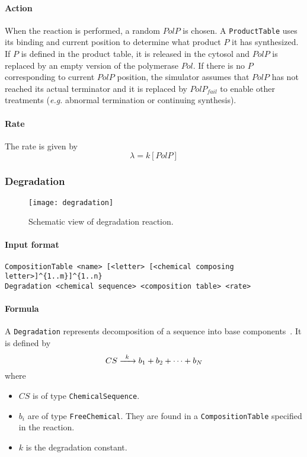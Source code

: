 \paragraph{Action}
When the reaction is performed, a random $PolP$ is chosen.
A \texttt{ProductTable} uses its binding and current position
to determine what product $P$ it has synthesized.
If $P$ is defined in the product table,
it is released in the cytosol and $PolP$ is replaced by
an empty version of the polymerase $Pol$.
If there is no $P$ corresponding to current $PolP$ position,
the simulator assumes that $PolP$ has not reached its actual terminator and
it is replaced by $PolP_{fail}$ to enable other treatments
(\textit{e.g.} abnormal termination or continuing synthesis).

\paragraph{Rate}
The rate is given by
\[
\lambda = k[PolP]
\]


\subsubsection{Degradation}

\begin{figure}[!h]
  \centering
  \texttt{[image: degradation]}
  \caption{Schematic view of degradation reaction.}
\label{fig:degradation}
\end{figure}

\paragraph{Input format}
\begin{verbatim}
CompositionTable <name> [<letter> [<chemical composing letter>]^{1..m}]^{1..n}
Degradation <chemical sequence> <composition table> <rate>
\end{verbatim}

\paragraph{Formula}
A \texttt{Degradation} represents decomposition of a sequence
into base components~.
It is defined by
\[
\reactionIrr{CS}{b_1 + b_2 + \cdots + b_N}{k}{}
\]
where
\begin{itemize}
	\item $CS$ is of type \texttt{ChemicalSequence}.
	\item $b_i$ are of type \texttt{FreeChemical}.
  They are found in a \texttt{CompositionTable} specified in the reaction.
	\item $k$ is the degradation constant.
\end{itemize}

